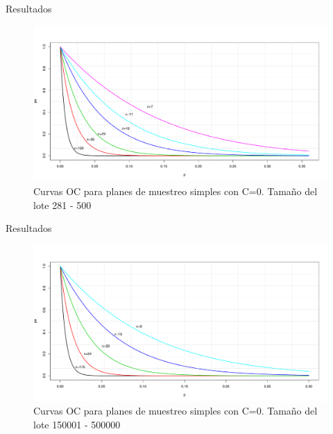 \documentclass[10pt]{beamer}
\begin{document}
\begin{frame}{Resultados}
\begin{figure}[h!]
  \centering
  \includegraphics[scale=0.33]{FigurasUV/CO8.pdf}
  \caption{Curvas OC para planes de muestreo simples con C=0. Tamaño del lote 281 - 500}
\end{figure}
\end{frame}

\begin{frame}{Resultados}
\begin{figure}[h!]
  \centering
  \includegraphics[scale=0.33]{FigurasUV/CO14.pdf}
  \caption{Curvas OC para planes de muestreo simples con C=0. Tamaño del lote 150001 - 500000}
\end{figure}
\end{frame}
\end{document}
